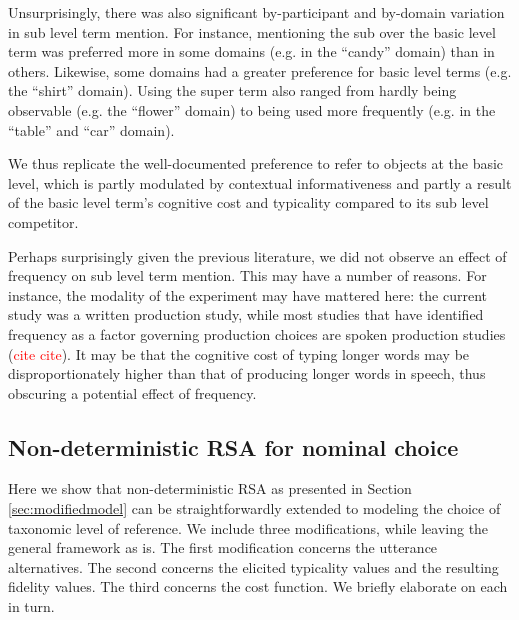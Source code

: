 \documentclass[11pt]{article}
\newcommand{\red}[1]{\textcolor{Red}{#1}}
\newcommand{\figref}[1]{Figure \ref{#1}}
\newcommand{\sectionref}[1]{Section \ref{#1}}
\begin{document}
Unsurprisingly, there was also significant by-participant and by-domain variation in sub level term mention. %
For instance, mentioning the sub over the basic level term was preferred more in some domains (e.g. in the ``candy'' domain) than in others. Likewise, some domains had a greater preference for basic level terms (e.g. the ``shirt'' domain). Using the super term also ranged from hardly being observable (e.g. the ``flower'' domain) to being used more frequently (e.g. in the ``table'' and ``car'' domain). 

We thus replicate the well-documented preference to refer to objects at the basic level, which is partly modulated by contextual informativeness and partly a result of the basic level term's cognitive cost and typicality compared to its sub level competitor. 

Perhaps surprisingly given the previous literature, we did not observe an effect of frequency on sub level term mention. This may have a number of reasons. For instance, the modality of the experiment may have mattered here: the current study was a written production study, while most studies that have identified frequency as a factor governing production choices are spoken production studies (\red{cite cite}). It may be that the cognitive cost of typing longer words may be disproportionately higher than that of producing longer words in speech, thus obscuring a potential effect of frequency. 

\subsection{Non-deterministic RSA for nominal choice}
\label{sec:reflevelmodel}

Here we show that non-deterministic RSA as presented in \sectionref{sec:modifiedmodel} can be straightforwardly extended to modeling the choice of taxonomic level of reference. We include three modifications, while leaving the general framework as is. The first modification concerns the utterance alternatives. The second concerns the elicited typicality values and the resulting fidelity values. The third concerns the cost function. We briefly elaborate on each in turn. 
\end{document}
